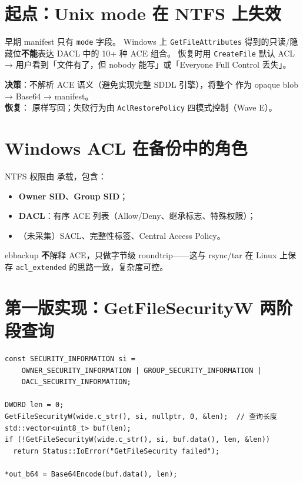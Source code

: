 
\section{起点：Unix mode 在 NTFS 上失效}

早期 manifest 只有 \texttt{mode} 字段。
Windows 上 \texttt{GetFileAttributes} 得到的只读/隐藏位\textbf{不能}表达 DACL 中的 10+ 种 ACE 组合。
恢复时用 \texttt{CreateFile} 默认 ACL → 用户看到「文件有了，但 nobody 能写」或「Everyone Full Control 丢失」。

\begin{evolbox}
\textbf{决策}：不解析 ACE 语义（避免实现完整 SDDL 引擎），将整个  作为 opaque blob → Base64 → manifest。\\
\textbf{恢复}： 原样写回；失败行为由 \texttt{AclRestorePolicy} 四模式控制（Wave E）。
\end{evolbox}

\section{Windows ACL 在备份中的角色}

NTFS 权限由  承载，包含：

\begin{itemize}[nosep]
  \item \textbf{Owner SID}、\textbf{Group SID}；
  \item \textbf{DACL}：有序 ACE 列表（Allow/Deny、继承标志、特殊权限）；
  \item （未采集）SACL、完整性标签、Central Access Policy。
\end{itemize}

ebbackup \textbf{不}解释 ACE，只做字节级 roundtrip——这与 rsync/tar 在 Linux 上保存 \texttt{acl\_extended} 的思路一致，复杂度可控。

\section{第一版实现：GetFileSecurityW 两阶段查询}

\begin{lstlisting}[caption={ReadSecurityDescriptorB64 (win\_meta.cc)}]
const SECURITY_INFORMATION si =
    OWNER_SECURITY_INFORMATION | GROUP_SECURITY_INFORMATION |
    DACL_SECURITY_INFORMATION;

DWORD len = 0;
GetFileSecurityW(wide.c_str(), si, nullptr, 0, &len);  // 查询长度
std::vector<uint8_t> buf(len);
if (!GetFileSecurityW(wide.c_str(), si, buf.data(), len, &len))
  return Status::IoError("GetFileSecurity failed");

*out_b64 = Base64Encode(buf.data(), len);
\end{lstlisting}

